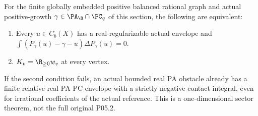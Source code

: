 \begin{theorem}\label{graph-contact}
For the finite globally embedded positive balanced rational graph and
actual positive-growth $\gamma\in\PA_\R\cap\PC_q$ of this section,
the following are equivalent:
\begin{enumerate}
\item Every $u\in C_b(X)$ has a real-regularizable actual envelope and
$\int(P_\gamma(u)-\gamma-u)\Delta P_\gamma(u)=0$.
\item $K_v=\R_{\geq0}w_v$ at every vertex.
\end{enumerate}
If the second condition fails, an actual bounded real PA obstacle already
has a finite relative real PA PC envelope with a strictly negative
contact integral, even for irrational coefficients of the actual reference.
This is a one-dimensional sector theorem, not the full original P05.2.
\end{theorem}
